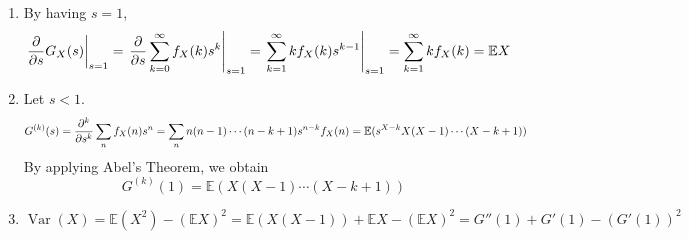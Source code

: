 \documentclass{huhtakm-template-book}
\newcommand{\expect}{\mathbb{E}}
\DeclareMathOperator{\Var}{Var}
\begin{document}
\begin{proofing}
	\begin{enumerate}
		\item By having $s=1$,
		\begin{equation*}
			\left.\pdv*{G_{X}(s)}{s}\right|_{s=1}=\left.\pdv*{\sum_{k=0}^{\infty}f_{X}(k)s^{k}}{s}\right|_{s=1}=\left.\sum_{k=1}^{\infty}kf_{X}(k)s^{k-1}\right|_{s=1}=\sum_{k=1}^{\infty}kf_{X}(k)=\expect X
		\end{equation*}
		\item Let $s<1$.
		\begin{equation*}
			G^{(k)}(s)=\pdv*[order={k}]{\sum_{n}f_{X}(n)s^{n}}{s}=\sum_{n}n(n-1)\cdots(n-k+1)s^{n-k}f_{X}(n)=\expect(s^{X-k}X(X-1)\cdots(X-k+1))
		\end{equation*}
		By applying Abel's Theorem, we obtain
		\begin{equation*}
			G^{(k)}(1)=\expect(X(X-1)\cdots(X-k+1))
		\end{equation*}
		\item 
		\begin{equation*}
			\Var(X)=\expect(X^{2})-(\expect X)^{2}=\expect(X(X-1))+\expect X-(\expect X)^{2}=G''(1)+G'(1)-(G'(1))^{2}
		\end{equation*}
	\end{enumerate}
\end{proofing}
\end{document}

